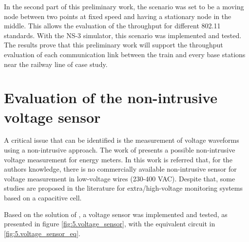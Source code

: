 	In the second part of this preliminary work, the scenario was set to be a moving node between two points at fixed speed and having a stationary node in the middle. This allows the evaluation of the throughput for different 802.11 standards. With the NS-3 simulator, this scenario was implemented and tested. The results prove that this preliminary work will support the throughput evaluation of each communication link between the train and every base stations near the railway line of case study.

\section{Evaluation of the non-intrusive voltage sensor}

	A critical issue that can be identified is the measurement of voltage waveforms using a non-intrusive approach. 
	The work of \cite{brunelli2016} presents a possible non-intrusive voltage measurement for energy meters.
	In this work is referred that, for the authors knowledge, there is no commercially available non-intrusive sensor for voltage measurement in low-voltage wires (230-400 VAC). 
	Despite that, some studies are proposed in the literature for extra/high-voltage monitoring systems based on a capacitive cell.
	
	Based on the solution of \cite{brunelli2016}, a voltage sensor was implemented and tested, as presented in figure \ref{fig:5.voltage_sensor}, with the equivalent circuit in \ref{fig:5.voltage_sensor_eq}. 
	
	
	
